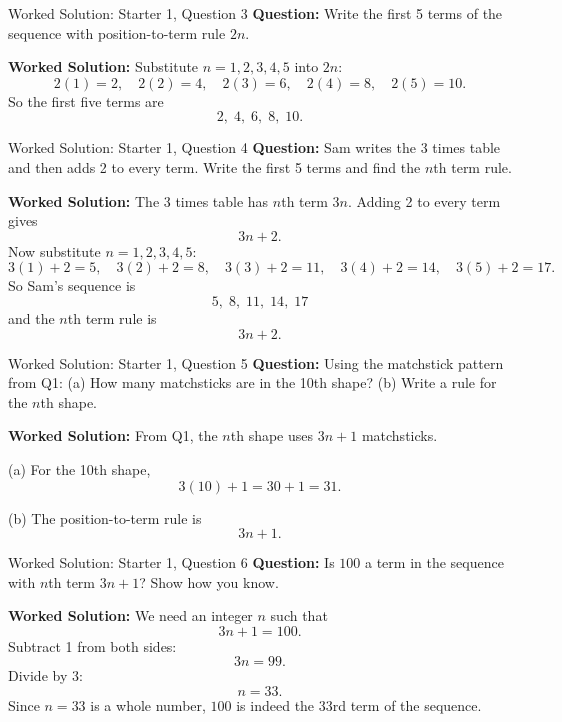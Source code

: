 \documentclass{beamer}
\begin{document}
\begin{frame}{Worked Solution: Starter 1, Question 3}
\textbf{Question:} Write the first 5 terms of the sequence with position-to-term rule $2n$.

\textbf{Worked Solution:} Substitute $n=1,2,3,4,5$ into $2n$:
\[
2(1)=2,\quad 2(2)=4,\quad 2(3)=6,\quad 2(4)=8,\quad 2(5)=10.
\]
So the first five terms are
\[
2,\;4,\;6,\;8,\;10.
\]
\end{frame}

\begin{frame}{Worked Solution: Starter 1, Question 4}
\textbf{Question:} Sam writes the 3 times table and then adds 2 to every term. Write the first 5 terms and find the $n$th term rule.

\textbf{Worked Solution:} The 3 times table has $n$th term $3n$. Adding 2 to every term gives
\[
3n+2.
\]
Now substitute $n=1,2,3,4,5$:
\[
3(1)+2=5,\quad 3(2)+2=8,\quad 3(3)+2=11,\quad 3(4)+2=14,\quad 3(5)+2=17.
\]
So Sam's sequence is
\[
5,\;8,\;11,\;14,\;17
\]
and the $n$th term rule is
\[
3n+2.
\]
\end{frame}

\begin{frame}{Worked Solution: Starter 1, Question 5}
\textbf{Question:} Using the matchstick pattern from Q1: (a) How many matchsticks are in the 10th shape? (b) Write a rule for the $n$th shape.

\textbf{Worked Solution:} From Q1, the $n$th shape uses $3n+1$ matchsticks.

(a) For the 10th shape,
\[
3(10)+1=30+1=31.
\]

(b) The position-to-term rule is
\[
3n+1.
\]
\end{frame}

\begin{frame}{Worked Solution: Starter 1, Question 6}
\textbf{Question:} Is $100$ a term in the sequence with $n$th term $3n+1$? Show how you know.

\textbf{Worked Solution:} We need an integer $n$ such that
\[
3n+1=100.
\]
Subtract 1 from both sides:
\[
3n=99.
\]
Divide by 3:
\[
n=33.
\]
Since $n=33$ is a whole number, $100$ is indeed the 33rd term of the sequence.
\end{frame}
\end{document}

